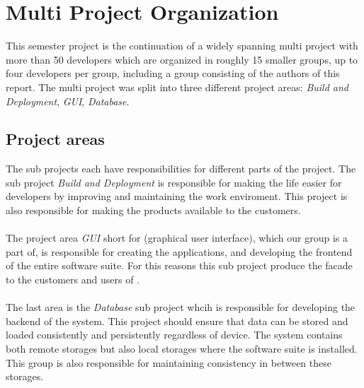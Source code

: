 
\section{Multi Project Organization}
\label{sec:multi_project_organization}

This semester project is the continuation of a widely spanning multi project with more than 50 developers which are organized in roughly 15 smaller groups, up to four developers per group, including a group consisting of the authors of this report. The multi project was split into three different project areas: \emph{Build and Deployment}, \emph{GUI}, \emph{Database}.

\subsection{Project areas}
The sub projects each have responsibilities for different parts of the project. The sub project \emph{Build and Deployment} is responsible for making the life easier for developers by improving and maintaining the work enviroment. This project is also responsible for making the products available to the customers.
\\\\
The project area \emph{GUI} short for (graphical user interface), which our group is a part of, is responsible for creating the applications, and developing the frontend of the entire \giraf software suite. For this reasons this sub project produce the facade to the customers and users of \giraf.
\\\\
The last area is the \emph{Database} sub project whcih is responsible for developing the backend of the system. This project should ensure that data can be stored and loaded consistently and persistently regardless of device. The \giraf system contains both remote storages but also local storages where the software suite is installed. This group is also responsible for maintaining consistency in between these storages.

